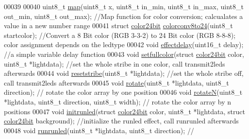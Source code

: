 \begin{DoxyCode}
00039 
00040 uint8\_t \hyperlink{_led_effects_8h_ad67a4e660b5122ed454e101432bbdba0}{map}(uint8\_t x, uint8\_t in\_min, uint8\_t in\_max, uint8\_t out\_min, uint8\_t out\_max);        \textcolor{comment}{//Map
       function for color conversion; calcualates a value in a new number range}
00041 \textcolor{keyword}{struct }\hyperlink{structcolor24bit}{color24bit} \hyperlink{_led_effects_8h_a55291315ab0f2ca8d508f0e9da1920a7}{colorconv8to24}(uint8\_t startcolor);                                           \textcolor{comment}{
      //Convert a 8 Bit color (RGB 3-3-2) to 24 Bit color (RGB 8-8-8); color assignment depends on the ledtype}
00042 \textcolor{keywordtype}{void} \hyperlink{_led_effects_8h_a6950e7657ba74d0d490ba36427533c4b}{effectdelay}(uint16\_t delay);                                                                \textcolor{comment}{
      //a simple variable delay function}
00043 \textcolor{keywordtype}{void} \hyperlink{_led_effects_8h_a2d54d1a6c61fe667b7c68ff04a11c503}{setfullcolor}(\textcolor{keyword}{struct} \hyperlink{structcolor24bit}{color24bit} color, uint8\_t *lightdata);                                   \textcolor{comment}{
      //set the whole stribe in one color, call transmit2leds afterwards}
00044 \textcolor{keywordtype}{void} \hyperlink{_led_effects_8h_a1c5e6b0f45c1787c25f8eafa8b9c6247}{resetstribe}(uint8\_t *lightdata);                                                            \textcolor{comment}{
      //set the whole stribe off, call transmit2leds afterwards}
00045 \textcolor{keywordtype}{void} \hyperlink{_led_effects_8h_afd64325b08e785d37b4dfaf358e517f0}{rotate}(uint8\_t *lightdata, uint8\_t direction);                                               \textcolor{comment}{//
      rotate the color array by one position}
00046 \textcolor{keywordtype}{void} \hyperlink{_led_effects_8h_a1fa5e03cb24195a46dcdc5948f596181}{rotateN}(uint8\_t *lightdata, uint8\_t direction, uint8\_t width);                              \textcolor{comment}{//
      rotate the color array by n positions}
00047 \textcolor{keywordtype}{void} \hyperlink{_led_effects_8h_aecba07ab559ab94e6f44c16e39012d80}{initrunled}(\textcolor{keyword}{struct} \hyperlink{structcolor24bit}{color24bit} color, uint8\_t *lightdata, \textcolor{keyword}{struct} 
      \hyperlink{structcolor24bit}{color24bit} background);       \textcolor{comment}{//initialize the runled effect, call runrunled afterwards}
00048 \textcolor{keywordtype}{void} \hyperlink{_led_effects_8h_a35cfbfc36c975f98a7779a37b6ff63ce}{runrunled}(uint8\_t *lightdata, uint8\_t direction);                                         \textcolor{comment}{//
}
\end{DoxyCode}
